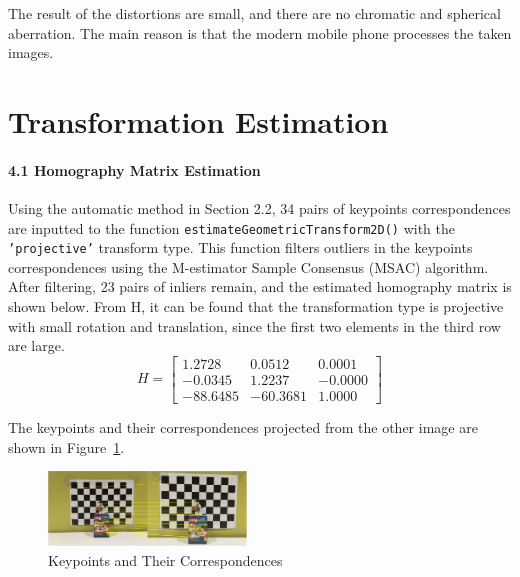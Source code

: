 \documentclass[10pt,twocolumn,letterpaper]{article}
\begin{document}
\noindent The result of the distortions are small, and there are no chromatic and spherical aberration. The main reason is that the modern mobile phone processes the taken images.




\section{Transformation Estimation}

\paragraph{4.1 Homography Matrix Estimation}
Using the automatic method in Section 2.2, 34 pairs of keypoints correspondences are inputted to the function \texttt{\textcolor[RGB]{28,172,0}{estimateGeometricTransform2D()}} with the \texttt{\textcolor[RGB]{170,4,249}{'projective'}} transform type. This function filters outliers in the keypoints correspondences using the M-estimator Sample Consensus (MSAC) algorithm. After filtering, 23 pairs of inliers remain, and the estimated homography matrix is shown below. From H, it can be found that the transformation type is projective with small rotation and translation, since the first two elements in the third row are large.
$$H=\begin{bmatrix} 
1.2728 & 0.0512 & 0.0001\\ 
-0.0345 & 1.2237 & -0.0000\\ 
-88.6485 & -60.3681 & 1.0000
\end{bmatrix}$$

\noindent The keypoints and their correspondences projected from the other image are shown in Figure~\ref{fig:4}.
\begin{figure}[h]
\begin{center}
    \includegraphics[width=0.47\textwidth]{4.1.png}
\end{center}
   \caption{Keypoints and Their Correspondences}
\label{fig:4}
\end{figure}
\end{document}
